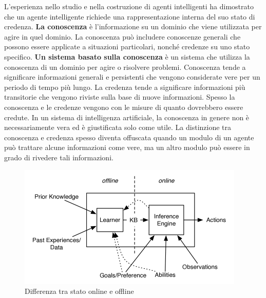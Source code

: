 \documentclass[a4paper]{extarticle}
\begin{document}
L'esperienza nello studio e nella costruzione di agenti intelligenti ha dimostrato che un agente intelligente richiede una rappresentazione interna del suo stato di credenza. \textbf{La conoscenza} è l'informazione su un dominio che viene utilizzata per agire in quel dominio. La conoscenza può includere conoscenze generali che possono essere applicate a situazioni particolari, nonché credenze su uno stato specifico. \textbf{Un sistema basato sulla conoscenza} è un sistema che utilizza la conoscenza di un dominio per agire o risolvere problemi. Conoscenza tende a significare informazioni generali e persistenti che vengono considerate vere per un periodo di tempo più lungo. La credenza tende a significare informazioni più transitorie che vengono riviste sulla base di nuove informazioni. Spesso la conoscenza e le credenze vengono con le misure di quanto dovrebbero essere credute. In un sistema di intelligenza artificiale, la conoscenza in genere non è necessariamente vera ed è giustificata solo come utile. La distinzione tra conoscenza e credenza spesso diventa offuscata quando un modulo di un agente può trattare alcune informazioni come vere, ma un altro modulo può essere in grado di rivedere tali informazioni.

\begin{figure}[h!]
\begin{center}
\includegraphics[scale=0.9]{scomposizione.png}
\caption{Differenza tra stato online e offline}
\end{center}
\end{figure}
\end{document}
